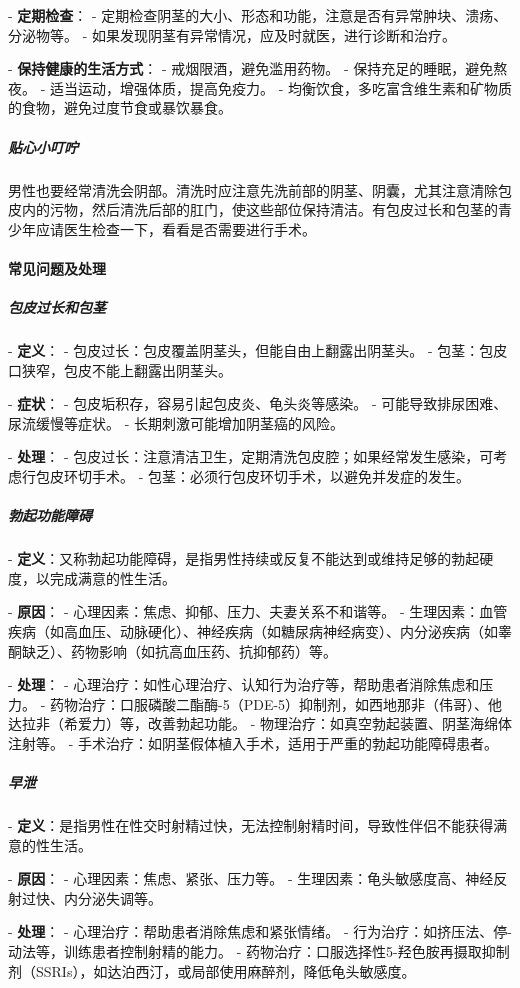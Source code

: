 - \textbf{定期检查}：
  - 定期检查阴茎的大小、形态和功能，注意是否有异常肿块、溃疡、分泌物等。
  - 如果发现阴茎有异常情况，应及时就医，进行诊断和治疗。

- \textbf{保持健康的生活方式}：
  - 戒烟限酒，避免滥用药物。
  - 保持充足的睡眠，避免熬夜。
  - 适当运动，增强体质，提高免疫力。
  - 均衡饮食，多吃富含维生素和矿物质的食物，避免过度节食或暴饮暴食。

\subparagraph{贴心小叮咛}

男性也要经常清洗会阴部。清洗时应注意先洗前部的阴茎、阴囊，尤其注意清除包皮内的污物，然后清洗后部的肛门，使这些部位保持清洁。有包皮过长和包茎的青少年应请医生检查一下，看看是否需要进行手术。

\paragraph{常见问题及处理}

\subparagraph{包皮过长和包茎}
- \textbf{定义}：
  - 包皮过长：包皮覆盖阴茎头，但能自由上翻露出阴茎头。
  - 包茎：包皮口狭窄，包皮不能上翻露出阴茎头。

- \textbf{症状}：
  - 包皮垢积存，容易引起包皮炎、龟头炎等感染。
  - 可能导致排尿困难、尿流缓慢等症状。
  - 长期刺激可能增加阴茎癌的风险。

- \textbf{处理}：
  - 包皮过长：注意清洁卫生，定期清洗包皮腔；如果经常发生感染，可考虑行包皮环切手术。
  - 包茎：必须行包皮环切手术，以避免并发症的发生。

\subparagraph{勃起功能障碍}
- \textbf{定义}：又称勃起功能障碍，是指男性持续或反复不能达到或维持足够的勃起硬度，以完成满意的性生活。

- \textbf{原因}：
  - 心理因素：焦虑、抑郁、压力、夫妻关系不和谐等。
  - 生理因素：血管疾病（如高血压、动脉硬化）、神经疾病（如糖尿病神经病变）、内分泌疾病（如睾酮缺乏）、药物影响（如抗高血压药、抗抑郁药）等。

- \textbf{处理}：
  - 心理治疗：如性心理治疗、认知行为治疗等，帮助患者消除焦虑和压力。
  - 药物治疗：口服磷酸二酯酶-5（PDE-5）抑制剂，如西地那非（伟哥）、他达拉非（希爱力）等，改善勃起功能。
  - 物理治疗：如真空勃起装置、阴茎海绵体注射等。
  - 手术治疗：如阴茎假体植入手术，适用于严重的勃起功能障碍患者。

\subparagraph{早泄}
- \textbf{定义}：是指男性在性交时射精过快，无法控制射精时间，导致性伴侣不能获得满意的性生活。

- \textbf{原因}：
  - 心理因素：焦虑、紧张、压力等。
  - 生理因素：龟头敏感度高、神经反射过快、内分泌失调等。

- \textbf{处理}：
  - 心理治疗：帮助患者消除焦虑和紧张情绪。
  - 行为治疗：如挤压法、停-动法等，训练患者控制射精的能力。
  - 药物治疗：口服选择性5-羟色胺再摄取抑制剂（SSRIs），如达泊西汀，或局部使用麻醉剂，降低龟头敏感度。

